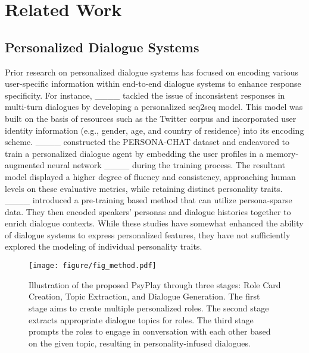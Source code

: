 \section{Related Work}
\subsection{Personalized Dialogue Systems}
Prior research on personalized dialogue systems has focused on encoding various user-specific information within end-to-end dialogue systems to enhance response specificity. For instance, ____ tackled the issue of inconsistent responses in multi-turn dialogues by developing a personalized seq2seq %
model. This model was built on the basis of resources such as the Twitter corpus and incorporated user identity information (e.g., gender, age, and country of residence) into its encoding scheme. ____ constructed the PERSONA-CHAT dataset and endeavored to train a personalized dialogue agent by embedding the user profiles in a memory-augmented neural network ____ during the training process. The resultant model displayed a higher degree of fluency and consistency, approaching human levels on these evaluative metrics, while retaining distinct personality traits. ____ introduced a pre-training based method that can utilize persona-sparse data. They then encoded speakers’ personas and dialogue histories together to enrich dialogue contexts. While these studies have somewhat enhanced the ability of dialogue systems to express personalized features, they have not sufficiently explored the modeling of individual personality traits.

\begin{figure*}[t]
	\centering
	\texttt{[image: figure/fig\_method.pdf]}
	\caption{Illustration of the proposed PsyPlay through three stages: Role Card Creation, Topic Extraction, and Dialogue Generation. The first stage aims to create multiple personalized roles. The second stage extracts appropriate dialogue topics for roles. The third stage prompts the roles to engage in conversation with each other based on the given topic, resulting in personality-infused dialogues.}
	\label{fig:method}
\vspace{-3mm}
\end{figure*}

